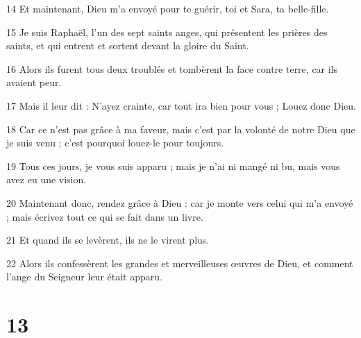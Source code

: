 \par 14 Et maintenant, Dieu m'a envoyé pour te guérir, toi et Sara, ta belle-fille.
\par 15 Je suis Raphaël, l'un des sept saints anges, qui présentent les prières des saints, et qui entrent et sortent devant la gloire du Saint.
\par 16 Alors ils furent tous deux troublés et tombèrent la face contre terre, car ils avaient peur.
\par 17 Mais il leur dit : N'ayez crainte, car tout ira bien pour vous ; Louez donc Dieu.
\par 18 Car ce n'est pas grâce à ma faveur, mais c'est par la volonté de notre Dieu que je suis venu ; c'est pourquoi louez-le pour toujours.
\par 19 Tous ces jours, je vous suis apparu ; mais je n'ai ni mangé ni bu, mais vous avez eu une vision.
\par 20 Maintenant donc, rendez grâce à Dieu : car je monte vers celui qui m'a envoyé ; mais écrivez tout ce qui se fait dans un livre.
\par 21 Et quand ils se levèrent, ils ne le virent plus.
\par 22 Alors ils confessèrent les grandes et merveilleuses œuvres de Dieu, et comment l'ange du Seigneur leur était apparu.

\chapter{13}

